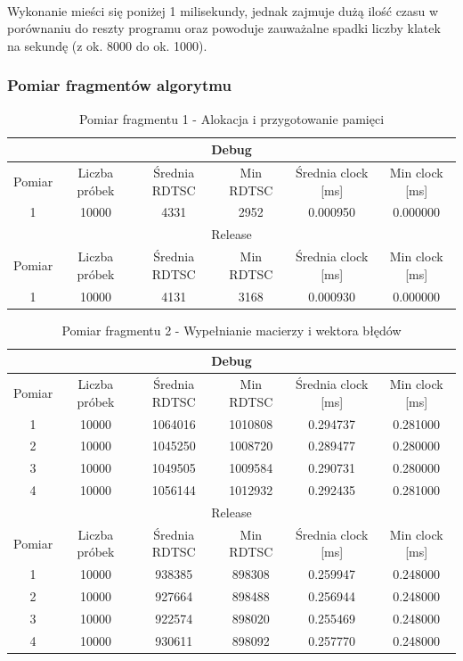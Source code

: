 \documentclass[12pt]{report}
\begin{document}
	\paragraph{}
	Wykonanie mieści się poniżej 1 milisekundy, jednak zajmuje dużą ilość czasu w porównaniu do reszty programu oraz powoduje zauważalne spadki liczby klatek na sekundę (z ok. 8000 do ok. 1000).
	
	
	\subsubsection{Pomiar fragmentów algorytmu}
	
	\begin{table}[H]
		\centering
		\caption{Pomiar fragmentu 1 - Alokacja i przygotowanie pamięci}
		\begin{tabular}{|c|c|c|c|c|c|} \hline
			\multicolumn{6}{|c|}{Debug} \\\hline
			Pomiar  & Liczba próbek & Średnia RDTSC & Min RDTSC & Średnia clock [ms] & Min clock [ms] \\\hline
			1 & 10000 & 4331 & 2952 & 0.000950 & 0.000000 \\\hline
			\hline
			\multicolumn{6}{|c|}{Release} \\\hline
			Pomiar  & Liczba próbek & Średnia RDTSC & Min RDTSC & Średnia clock [ms] & Min clock [ms] \\\hline
			1 & 10000 & 4131 & 3168 & 0.000930 & 0.000000 \\\hline
		\end{tabular}
	\end{table}
	
	\begin{table}[H]
		\centering
		\caption{Pomiar fragmentu 2 - Wypełnianie macierzy i wektora błędów}
		\begin{tabular}{|c|c|c|c|c|c|} \hline
			\multicolumn{6}{|c|}{Debug} \\\hline
			Pomiar  & Liczba próbek & Średnia RDTSC & Min RDTSC & Średnia clock [ms] & Min clock [ms] \\\hline
			1 & 10000 & 1064016 & 1010808 & 0.294737 & 0.281000 \\\hline
			2 & 10000 & 1045250 & 1008720 & 0.289477 & 0.280000 \\\hline
			3 & 10000 & 1049505 & 1009584 & 0.290731 & 0.280000 \\\hline
			4 & 10000 & 1056144 & 1012932 & 0.292435 & 0.281000 \\\hline
			\hline
			\multicolumn{6}{|c|}{Release} \\\hline
			Pomiar  & Liczba próbek & Średnia RDTSC & Min RDTSC & Średnia clock [ms] & Min clock [ms] \\\hline
			1 & 10000 & 938385 & 898308 & 0.259947 & 0.248000 \\\hline
			2 & 10000 & 927664 & 898488 & 0.256944 & 0.248000 \\\hline
			3 & 10000 & 922574 & 898020 & 0.255469 & 0.248000 \\\hline
			4 & 10000 & 930611 & 898092 & 0.257770 & 0.248000 \\\hline
			
		\end{tabular}
	\end{table}
	
\end{document}
